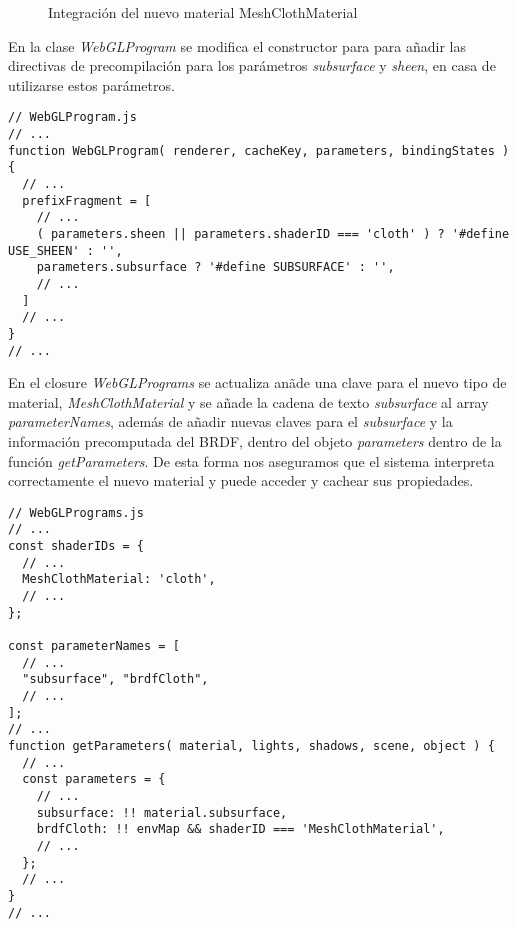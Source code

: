 \begin{figure}[H]
  \vspace{0.5cm}
  \centering
  \caption{Integraci\'on del nuevo material MeshClothMaterial}
\end{figure}
\singlespacing

En la clase \textit{WebGLProgram} se modifica el constructor para para a\~nadir las directivas de precompilaci\'on
para los par\'ametros \textit{subsurface} y \textit{sheen}, en casa de utilizarse estos par\'ametros.\\

\begin{lstlisting}[caption=Cambios sobre la clase WebGLProgram de ThreeJs]
// WebGLProgram.js
// ...
function WebGLProgram( renderer, cacheKey, parameters, bindingStates ) {
  // ...
  prefixFragment = [
    // ...
    ( parameters.sheen || parameters.shaderID === 'cloth' ) ? '#define USE_SHEEN' : '',
    parameters.subsurface ? '#define SUBSURFACE' : '',
    // ...
  ]
  // ...
}
// ...
\end{lstlisting}
\singlespacing

En el closure \textit{WebGLPrograms} se actualiza an\~ade una clave para el nuevo tipo de material, \textit{MeshClothMaterial}
y se a\~nade la cadena de texto \textit{subsurface} al array \textit{parameterNames}, adem\'as de a\~nadir nuevas claves para
el \textit{subsurface} y la informaci\'on precomputada del BRDF, dentro del objeto \textit{parameters} dentro de la funci\'on
\textit{getParameters}. De esta forma nos aseguramos que el sistema interpreta correctamente el nuevo material y puede acceder
y cachear sus propiedades.

\singlespacing
\begin{lstlisting}[caption=Cambios sobre la clase WebGLPrograms de ThreeJs]
// WebGLPrograms.js
// ...
const shaderIDs = {
  // ...
  MeshClothMaterial: 'cloth',
  // ...
};

const parameterNames = [
  // ...
  "subsurface", "brdfCloth",
  // ...
];
// ...
function getParameters( material, lights, shadows, scene, object ) {
  // ...
  const parameters = {
    // ...
    subsurface: !! material.subsurface,
    brdfCloth: !! envMap && shaderID === 'MeshClothMaterial',
    // ...
  };
  // ...
}
// ...
\end{lstlisting}



